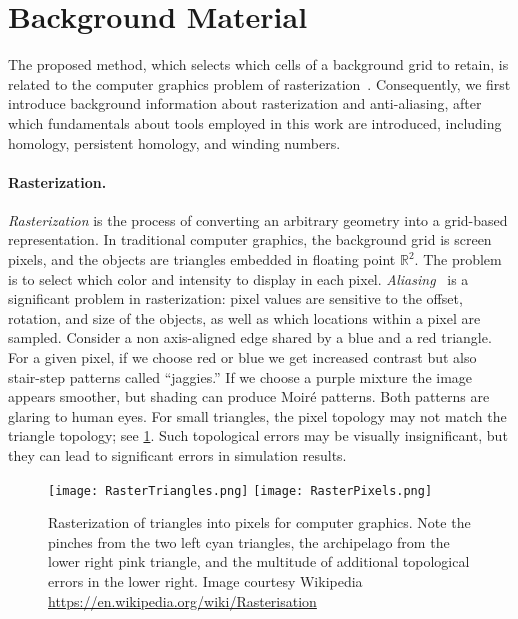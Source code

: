 \section{Background Material}
The proposed method, which selects which cells of a background grid to retain, is related to the computer graphics problem of rasterization~\cite{GPUGemsRaster}. 
Consequently, we first introduce background information about rasterization and anti-aliasing, after which fundamentals about tools employed in this work are introduced, including homology, persistent homology, and winding numbers.

\paragraph{Rasterization.}\label{sec:rasterization}
 \emph{Rasterization} is the process of converting an arbitrary geometry into a grid-based representation.
In traditional computer graphics, the background grid is screen pixels, and the objects are triangles embedded in floating point $\mathbb{R}^2$. 
The problem is to select which color and intensity to display in each pixel. 
\emph{Aliasing}~\cite{crow1977aliasing,mitchell1990antialiasing} is a significant problem in rasterization: 
pixel values are sensitive to the offset, rotation, and size of the objects, as well as which locations within a pixel are sampled.
Consider a non axis-aligned edge shared by a blue and a red triangle.
For a given pixel, if we choose red or blue we get increased contrast but also stair-step patterns called ``jaggies.''
If we choose a purple mixture the image appears smoother, but shading can produce Moir\'e patterns.
Both patterns are glaring to human eyes. 
For small triangles, the pixel topology may not match the triangle topology; see \cref{fig:TopologicalErrorRaster}.
Such topological errors may be visually insignificant, but they can lead to significant errors in simulation results.

\begin{figure}[!htb]
\centering
\texttt{[image: RasterTriangles.png]}
\hspace{0.02\columnwidth}
\texttt{[image: RasterPixels.png]}
\caption{Rasterization of triangles into pixels for computer graphics.  Note the pinches from the two left cyan triangles, the archipelago from the lower right pink triangle, and the multitude of additional topological errors in the lower right. Image courtesy Wikipedia \url{https://en.wikipedia.org/wiki/Rasterisation}}\label{fig:TopologicalErrorRaster}
\end{figure}

